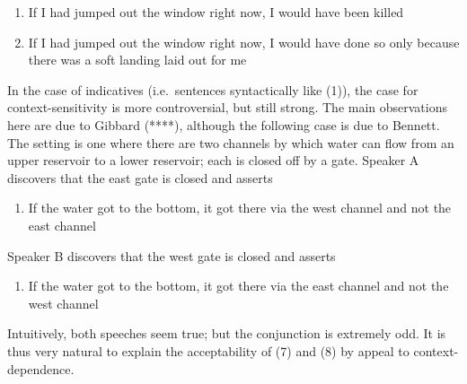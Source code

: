 \begin{enumerate}
\def\labelenumi{(\arabic{enumi})}
\setcounter{enumi}{4}
\item
  If I had jumped out the window right now, I would have been killed
\item
  If I had jumped out the window right now, I would have done so only
  because there was a soft landing laid out for me
\end{enumerate}

In the case of indicatives (i.e.~sentences syntactically like (1)), the
case for context-sensitivity is more controversial, but still strong.
The main observations here are due to Gibbard (****), although the
following case is due to Bennett. The setting is one where there are two
channels by which water can flow from an upper reservoir to a lower
reservoir; each is closed off by a gate. Speaker A discovers that the
east gate is closed and asserts

\begin{enumerate}
\def\labelenumi{(\arabic{enumi})}
\setcounter{enumi}{6}
\itemsep1pt\parskip0pt
\item
  If the water got to the bottom, it got there via the west channel and
  not the east channel
\end{enumerate}

Speaker B discovers that the west gate is closed and asserts

\begin{enumerate}
\def\labelenumi{(\arabic{enumi})}
\setcounter{enumi}{7}
\itemsep1pt\parskip0pt
\item
  If the water got to the bottom, it got there via the east channel and
  not the west channel
\end{enumerate}

Intuitively, both speeches seem true; but the conjunction is extremely
odd. It is thus very natural to explain the acceptability of (7) and (8)
by appeal to context-dependence.


